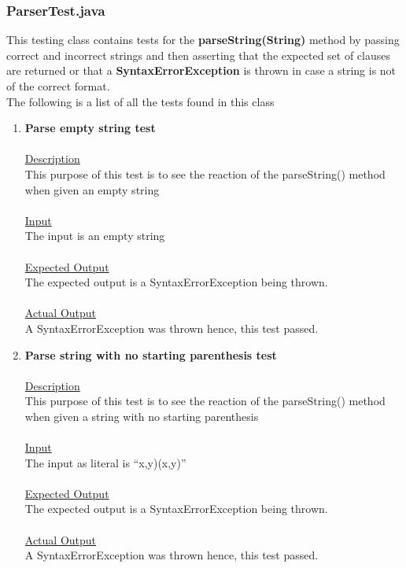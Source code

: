 \documentclass{article}
\newcommand{\quotes}[1]{``#1''}
\begin{document}
	\subsubsection{ParserTest.java}
	
	This testing class contains tests for the \textbf{parseString(String)} method by passing correct and incorrect strings and then asserting that the expected set of clauses are returned or that a \textbf{SyntaxErrorException} is thrown in case a string is not of the correct format.\\
	The following is a list of all the tests found in this class
	

	\begin{enumerate}
		\item \textbf{Parse empty string test}\\\\
		\underline{Description}\\
		\indent This purpose of this test is to see the reaction of the parseString() method when given an empty string\\\\
		\underline{Input}\\
		\indent The input is an empty string\\	\\
		\underline{Expected Output}\\
		\indent The expected output is a SyntaxErrorException being thrown.\\\\
		\underline{Actual Output}\\
		\indent A SyntaxErrorException was thrown hence, this test passed.\\
		
		\item \textbf{Parse string with no starting parenthesis test}\\\\
		\underline{Description}\\
		\indent This purpose of this test is to see the reaction of the parseString() method when given a string with no starting parenthesis\\\\
		\underline{Input}\\
		\indent The input as literal is \quotes{x,y)(x,y)}\\	\\
		\underline{Expected Output}\\
		\indent The expected output is a SyntaxErrorException being thrown.\\\\
		\underline{Actual Output}\\
		\indent A SyntaxErrorException was thrown hence, this test passed.\\
		

\end{enumerate}
\end{document}
